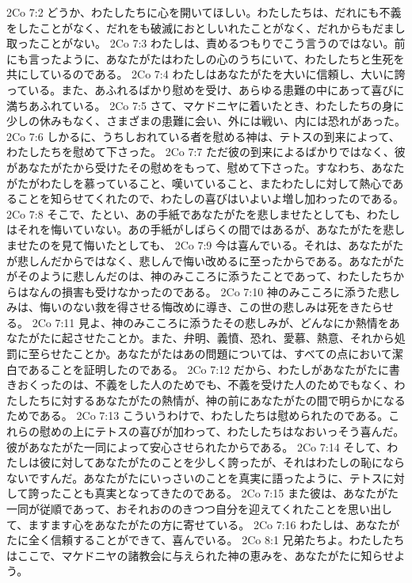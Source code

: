 2Co 7:2  どうか、わたしたちに心を開いてほしい。わたしたちは、だれにも不義をしたことがなく、だれをも破滅におとしいれたことがなく、だれからもだまし取ったことがない。
2Co 7:3  わたしは、責めるつもりでこう言うのではない。前にも言ったように、あなたがたはわたしの心のうちにいて、わたしたちと生死を共にしているのである。
2Co 7:4  わたしはあなたがたを大いに信頼し、大いに誇っている。また、あふれるばかり慰めを受け、あらゆる患難の中にあって喜びに満ちあふれている。
2Co 7:5  さて、マケドニヤに着いたとき、わたしたちの身に少しの休みもなく、さまざまの患難に会い、外には戦い、内には恐れがあった。
2Co 7:6  しかるに、うちしおれている者を慰める神は、テトスの到来によって、わたしたちを慰めて下さった。
2Co 7:7  ただ彼の到来によるばかりではなく、彼があなたがたから受けたその慰めをもって、慰めて下さった。すなわち、あなたがたがわたしを慕っていること、嘆いていること、またわたしに対して熱心であることを知らせてくれたので、わたしの喜びはいよいよ増し加わったのである。
2Co 7:8  そこで、たとい、あの手紙であなたがたを悲しませたとしても、わたしはそれを悔いていない。あの手紙がしばらくの間ではあるが、あなたがたを悲しませたのを見て悔いたとしても、
2Co 7:9  今は喜んでいる。それは、あなたがたが悲しんだからではなく、悲しんで悔い改めるに至ったからである。あなたがたがそのように悲しんだのは、神のみこころに添うたことであって、わたしたちからはなんの損害も受けなかったのである。
2Co 7:10  神のみこころに添うた悲しみは、悔いのない救を得させる悔改めに導き、この世の悲しみは死をきたらせる。
2Co 7:11  見よ、神のみこころに添うたその悲しみが、どんなにか熱情をあなたがたに起させたことか。また、弁明、義憤、恐れ、愛慕、熱意、それから処罰に至らせたことか。あなたがたはあの問題については、すべての点において潔白であることを証明したのである。
2Co 7:12  だから、わたしがあなたがたに書きおくったのは、不義をした人のためでも、不義を受けた人のためでもなく、わたしたちに対するあなたがたの熱情が、神の前にあなたがたの間で明らかになるためである。
2Co 7:13  こういうわけで、わたしたちは慰められたのである。これらの慰めの上にテトスの喜びが加わって、わたしたちはなおいっそう喜んだ。彼があなたがた一同によって安心させられたからである。
2Co 7:14  そして、わたしは彼に対してあなたがたのことを少しく誇ったが、それはわたしの恥にならないですんだ。あなたがたにいっさいのことを真実に語ったように、テトスに対して誇ったことも真実となってきたのである。
2Co 7:15  また彼は、あなたがた一同が従順であって、おそれおののきつつ自分を迎えてくれたことを思い出して、ますます心をあなたがたの方に寄せている。
2Co 7:16  わたしは、あなたがたに全く信頼することができて、喜んでいる。
2Co 8:1  兄弟たちよ。わたしたちはここで、マケドニヤの諸教会に与えられた神の恵みを、あなたがたに知らせよう。
